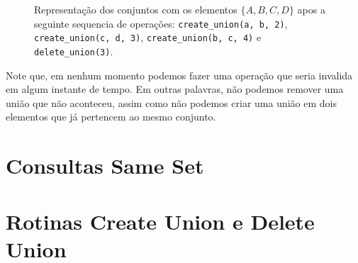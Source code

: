 \begin{figure}[h!]
\begin{subfigure}{\textwidth}
    \end{subfigure}
    \caption{Representação dos conjuntos com os elementos $\{A,B,C,D\}$ apos a seguinte sequencia de operações: \texttt{create\_union(a, b, 2)}, \texttt{create\_union(c, d, 3)}, \texttt{create\_union(b, c, 4)} e \texttt{delete\_union(3)}.}
    \label{fig:uf-sets}
\end{figure}


Note que, em nenhum momento podemos fazer uma operação que seria invalida em algum instante de tempo. Em outras palavras, não podemos remover uma união que não aconteceu, assim como não podemos criar uma união em dois elementos que já pertencem ao mesmo conjunto.

\section{Consultas Same Set}
\label{sec:uf-same-set}


\section{Rotinas Create Union e Delete Union}
\label{sec:uf-union}